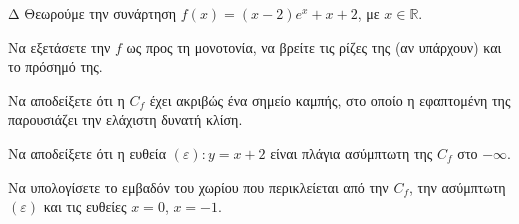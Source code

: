 \begin{thema}{Δ}
Θεωρούμε την συνάρτηση $f(x) = (x-2)e^x + x + 2$, με $x \in \mathbb{R}$.
\begin{erwthma}
    \item Να εξετάσετε την $f$ ως προς τη μονοτονία, να βρείτε τις ρίζες της (αν υπάρχουν) και το πρόσημό της.
    \item Να αποδείξετε ότι η $C_f$ έχει ακριβώς ένα σημείο καμπής, στο οποίο η εφαπτομένη της παρουσιάζει την ελάχιστη δυνατή κλίση.
    \item Να αποδείξετε ότι η ευθεία $(\varepsilon): y = x + 2$ είναι πλάγια ασύμπτωτη της $C_f$ στο $-\infty$.
    \item Να υπολογίσετε το εμβαδόν του χωρίου που περικλείεται από την $C_f$, την ασύμπτωτη $(\varepsilon)$ και τις ευθείες $x=0$, $x=-1$.
\end{erwthma}
\end{thema}
